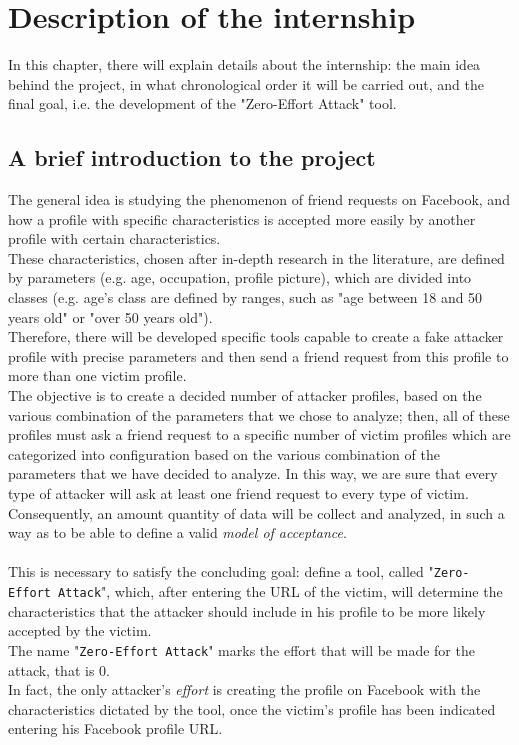 
\chapter{Description of the internship}
\label{cap:description-internship}

In this chapter, there will explain details about the internship: the main idea behind the project, in what chronological order it will be carried out, and the final goal, i.e. the development of the "Zero-Effort Attack" tool. 

\section{A brief introduction to the project}
The general idea is studying the phenomenon of friend requests on Facebook, and how a profile with specific characteristics is accepted more easily by another profile with certain characteristics. \\
These characteristics, chosen after in-depth research in the literature, are defined by parameters (e.g. age, occupation, profile picture), which are divided into classes (e.g. age's class are defined by ranges, such as "age between 18 and 50 years old" or "over 50 years old").
\\Therefore, there will be developed specific tools capable to create a fake attacker profile with precise parameters and then send a friend request from this profile to more than one victim profile. \\The objective is to create a decided number of attacker profiles, based on the various combination of the parameters that we chose to analyze; then, all of these profiles must ask a friend request to a specific number of victim profiles which are categorized into configuration based on the various combination of the parameters that we have decided to analyze. In this way, we are sure that every type of attacker will ask at least one friend request to every type of victim. \\Consequently, an amount quantity of data will be collect and analyzed, in such a way as to be able to define a valid \emph{model of acceptance}.
\\\\This is necessary to satisfy the concluding goal: define a tool, called "\texttt{Zero-Effort Attack}", which, after entering the URL of the victim, will determine the characteristics that the attacker should include in his profile to be more likely accepted by the victim.
\\The name "\texttt{Zero-Effort Attack}" marks the effort that will be made for the attack, that is $0$.\\
In fact, the only attacker's \emph{effort} is creating the profile on Facebook with the characteristics dictated by the tool, once the victim's profile has been indicated entering his Facebook profile URL.
